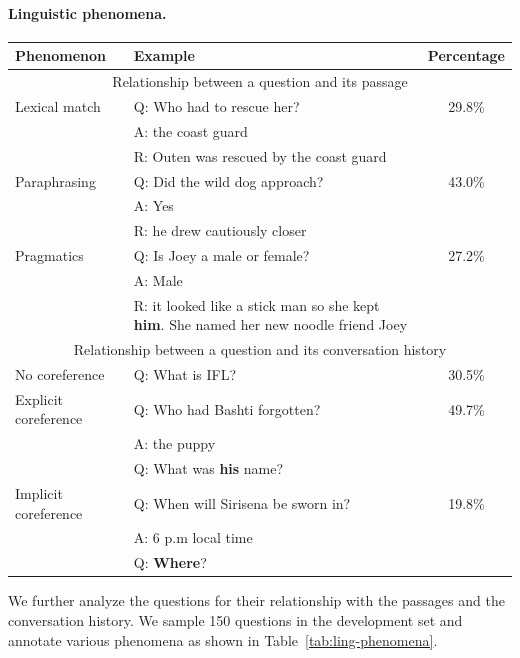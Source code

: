 \paragraph{Linguistic phenomena.}

\begin{table}[!t]
\centering
\small
\begin{tabular}{lp{7cm}c}
\toprule
\bf Phenomenon & \bf Example & \bf Percentage \\
\midrule
\multicolumn{3}{c}{Relationship between a question and its passage} \\
\midrule
Lexical match & Q: Who had to rescue her?& 29.8\% \\
& A: the coast guard \\
& R: Outen was rescued by the coast guard \\
Paraphrasing & Q: Did the wild dog approach? & 43.0\% \\
& A: Yes \\
& R: he drew cautiously closer \\
Pragmatics &  Q:               Is Joey a male or female?  &  27.2\% \\
 & A:  Male \\
& R: it looked like a stick man so she kept \textbf{him}. She named her new noodle friend Joey \\
\midrule
\multicolumn{3}{c}{Relationship between a question and its conversation history} \\
\midrule
No coreference & Q: What is IFL? & 30.5\% \\
Explicit coreference & Q: Who had Bashti forgotten? & 49.7\% \\
& A: the puppy \\
& Q: What was \textbf{his} name? \\
Implicit coreference & Q: When will Sirisena be sworn in? & 19.8\% \\
& A: 6 p.m local time  \\
& Q: \textbf{Where}?\\
\bottomrule
\end{tabular}
\end{table}
We further analyze the questions for their relationship with the passages and the conversation history. We sample 150 questions in the development set and annotate various phenomena as shown in Table~\ref{tab:ling-phenomena}.

